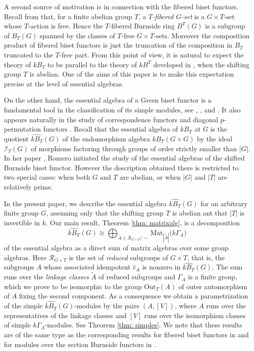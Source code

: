 \documentclass[12pt]{article}
\theoremstyle{change}
\newcommand{\calI}{\mathcal{I}}
\newcommand{\calR}{\mathcal{R}}
\newcommand{\Mat}{\mathrm{Mat}}
\newcommand{\Out}{\mathrm{Out}}
\newcommand{\1}{{\bf 1}}
\begin{document}
A second source of motivation is in connection with the fibered biset functors. Recall from \cite{BC} that, for a finite abelian group $T$, a \emph{$T$-fibered $G$-set} is a $G\times T$-set whose $T$-action is free. Hence the $T$-fibered Burnside ring $B^T(G)$ is a subgroup of $B_T(G)$ spanned by the classes of $T$-free $G\times T$-sets. Moreover the composition product of fibered biset functors is just the truncation of the composition in $B_T$ truncated to the $T$-free part. From this point of view, it is natural to expect the theory of $kB_T$ to be parallel to the theory of $kB^T$ developed in \cite{BC}, when the shifting group $T$ is abelian. One of the aims of this paper is to make this expectation precise at the level of essential algebras. 

On the other hand, the essential algebra of a Green biset functor is a fundamental tool in the classification of its simple modules, see \cite{B}, \cite{BC}, \cite{CM} and \cite{R2}. It also appears naturally in the study of correspondence functors \cite{BT1} and diagonal $p$-permutation functors \cite{BY}. Recall that the essential algebra of $kB_T$ at $G$ is the quotient $\widehat{kB_T}(G)$ of the endomorphism algebra $kB_T(G\times G)$ by the ideal $\calI_T(G)$ of morphisms factoring through groups of order strictly smaller than $|G|$. In her paper \cite{R1}, Romero initiated the study of the essential algebras of the shifted Burnside biset functor. However the description obtained there is restricted to two special cases: when both $G$ and $T$ are abelian, or when $|G|$ and $|T|$ are relatively prime.

In the present paper, we describe the essential algebra $\widehat{kB_T}(G)$ for an arbitrary finite group $G$, assuming only that the shifting group $T$ is abelian ant that $|T|$ is invertible in $k$. Our main result, Theorem \ref{thm: matrixalg}, is a decomposition
\[
\widehat{kB_T}(G) \cong \bigoplus_{\widetilde{A}\in \calR_{G\times T}/\sim} \Mat_{|\widetilde{A}|}\bigl( k\Gamma_A \bigr)
\]
of the essential algebra as a direct sum of matrix algebras over some group algebras. Here $\calR_{G\times T}$ is the set of \emph{reduced} subgroups of $G\times T$, that is, the subgroups $A$ whose associated idempotent $\widehat{e}_A$ is nonzero in $\widehat{kB_T}(G)$. The sum runs over the \emph{linkage classes} $\widetilde{A}$ of reduced subgroups and $\Gamma_A$ is a finite group, which we prove to be isomorphic to the group $\Out_T(A)$ of outer automorphism of $A$ fixing the second component. As a consequence we obtain a parametrization of the simple $\widehat{kB_T}(G)$-modules by the pairs $(A, [V])$, where $A$ runs over the representatives of the linkage classes and $[V]$ runs over the isomorphism classes of simple $k\Gamma_A$-modules. 
See Theorem \ref{thm: simples}. We note that these results are of the same type as the corresponding results for fibered biset functors in \cite{BC} and for modules over the section Burnside functors in \cite{CM}.
\end{document}
